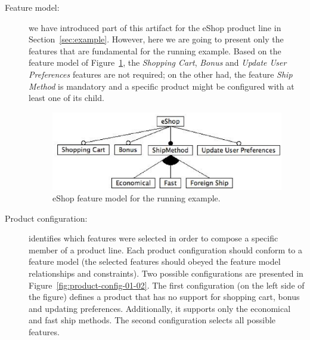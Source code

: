 \documentclass{acm_proc_article-sp}
\begin{document}
\begin{description}
\item[Feature model:]we have introduced part of this artifact for the eShop product line in Section~\ref{sec:example}. However, here we are going to 
present only the features that are fundamental for the running example. Based on the feature model of Figure~\ref{fig:eshop-fm-re}, the \emph{Shopping 
Cart}, \emph{Bonus} and \emph{Update User Preferences} features are not required; on the other had, the feature \emph{Ship Method} is mandatory and 
a specific product might be configured with at least one of its child.  

 \begin{figure}[h]
 \begin{center}
  \includegraphics[scale=0.40]{img/eShop-fm-re.eps}
   \caption{eShop feature model for the running example.}
  \label{fig:eshop-fm-re}
  \end{center}
\end{figure}


\item[Product configuration:]

identifies which features were selected in order to compose a specific member of a product line. Each product configuration should 
conform to a feature model (the selected features should obeyed the feature model relationships and constraints). Two possible 
configurations are presented in Figure~\ref{fig:product-config-01-02}. The first configuration (on the left side of the figure) defines a
product that has no support for shopping cart, bonus and updating preferences. Additionally, it supports only the economical and fast 
ship methods. The second configuration selects all possible features.  


\end{description}
\end{document}
